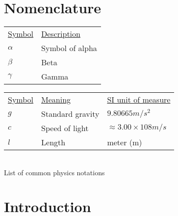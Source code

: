 \renewcommand*\contentsname{Table of Contents}
\singlespacing
\newpage
{}
\pagestyle{plain}
\tableofcontents
\clearpage
{}

\listoftables
\listoffigures

\newpage
{}
\chapter*{Nomenclature}
\pagestyle{plain}

\begin{center}
  \begin{tabular}{C{0.2\textwidth} C{0.4\textwidth}}
    \hline
    \underline{Symbol} & \centerline{\underline{Description}} \\
    $\alpha$	&	Symbol of alpha 	\\
    $\beta$		&	Beta				\\
    $\gamma$	&	Gamma				\\
    \hline
  \end{tabular}
\end{center}

\EmptyLine

\begin{center}
  \begin{tabular}{C{0.2\textwidth} C{0.4\textwidth} C{0.35\textwidth}}
    \hline
    \underline{Symbol} & \underline{Meaning} & \underline{SI unit of measure}	\\
    $g$		&	Standard gravity	&	$9.80665 m/s^2$							\\
    $c$		&	Speed of light		&	$\approx3.00\times108 m/s$				\\
    $l$		&	Length				&	meter (m)								\\
 	\hline
  \end{tabular}
  \vspace{0.1cm}\\{List of common physics notations}
\end{center}
\clearpage
{}


\setcounter{page}{1}
\newpage
{}
\chapter{Introduction}
\pagestyle{plain}

